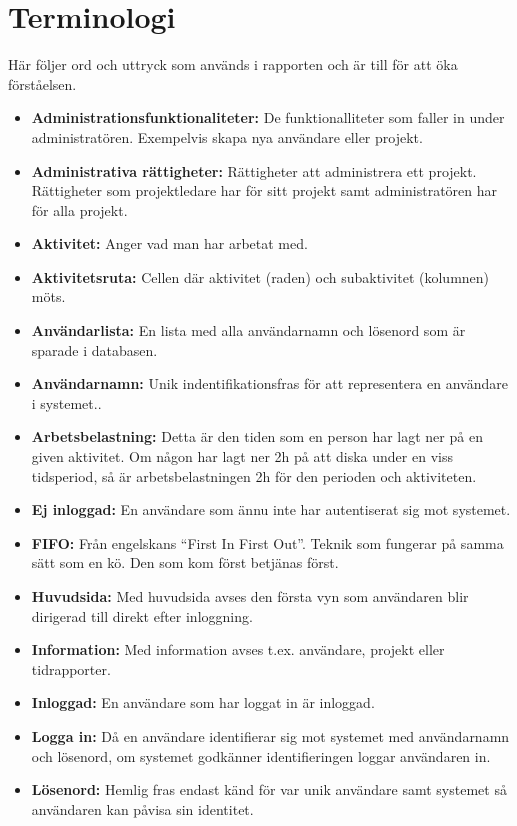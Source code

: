\documentclass[a4paper]{article}
\begin{document}
\section{Terminologi}
\label{terminologi}
Här följer ord och uttryck som används i rapporten och är till för att öka förståelsen.
\begin{itemize}
\item [] \textbf{Administrationsfunktionaliteter:} De funktionalliteter som faller in under administratören. Exempelvis skapa nya användare eller projekt.
\item [] \textbf{Administrativa rättigheter:} Rättigheter att administrera ett projekt. Rättigheter som projektledare har för sitt projekt samt administratören har för alla projekt.
\item [] \textbf{Aktivitet:} Anger vad man har arbetat med.
\item [] \textbf{Aktivitetsruta:} Cellen där aktivitet (raden) och subaktivitet (kolumnen) möts.
\item [] \textbf{Användarlista:} En lista med alla användarnamn och lösenord som är sparade i databasen.
\item [] \textbf{Användarnamn:} Unik indentifikationsfras för att representera en användare i systemet..
\item [] \textbf{Arbetsbelastning:} Detta är den tiden som en person har lagt ner på en given aktivitet. Om någon har lagt ner 2h på att diska under en viss tidsperiod, så är arbetsbelastningen 2h för den perioden och aktiviteten.
\item [] \textbf{Ej inloggad:} En användare som ännu inte har autentiserat sig mot systemet.
\item [] \textbf{FIFO:} Från engelskans ``First In First Out''. Teknik som fungerar på samma sätt som en kö. Den som kom först betjänas först.
\item [] \textbf{Huvudsida:} Med huvudsida avses den första vyn som användaren blir dirigerad till direkt efter inloggning. 
\item [] \textbf{Information:} Med information avses t.ex. användare, projekt eller tidrapporter.
\item [] \textbf{Inloggad:} En användare som har loggat in är inloggad.
\item [] \textbf{Logga in:} Då en användare identifierar sig mot systemet med användarnamn och lösenord, om systemet godkänner identifieringen loggar användaren in.
\item [] \textbf{Lösenord:} Hemlig fras endast känd för var unik användare samt systemet så användaren kan påvisa sin identitet.

\end{itemize}
\end{document}
